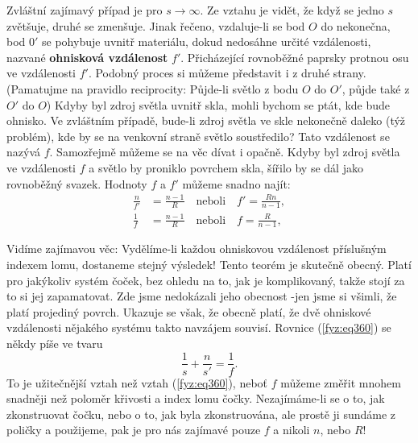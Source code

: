 {    Zvláštní zajímavý případ je pro \(s\rightarrow\infty\). Ze vztahu je vidět, že když se jedno 
    \(s\) zvětšuje, druhé se zmenšuje. Jinak řečeno, vzdaluje-li se bod \(O\) do nekonečna, bod 
    \(0'\) se pohybuje uvnitř materiálu, dokud nedosáhne určité vzdálenosti, nazvané 
    \textbf{ohnisková vzdálenost} \(f'\). Přicházející rovnoběžné paprsky protnou osu ve 
    vzdálenosti \(f'\). Podobný proces si můžeme představit i z druhé strany. (Pamatujme na 
    pravidlo reciprocity: Půjde-li světlo z bodu \(O\) do \(O'\), půjde také z \(O'\) do \(O\)) 
    Kdyby byl zdroj světla uvnitř skla, mohli bychom se ptát, kde bude ohnisko. Ve zvláštním 
    případě, bude-li zdroj světla ve skle nekonečně daleko (týž problém), kde by se na venkovní 
    straně světlo soustředilo? Tato vzdálenost se nazývá \(f\). Samozřejmě můžeme se na věc dívat i 
    opačně. Kdyby byl zdroj světla ve vzdálenosti \(f\) a světlo by proniklo povrchem skla, šířilo 
    by se dál jako rovnoběžný svazek. Hodnoty \(f\) a \(f'\) můžeme snadno najít:
    \begin{subequations}\label{fyz:eq361}
      \begin{align}
        \frac{n}{f'}&=\frac{n-1}{R} \quad\text{neboli}\quad f'=\frac{Rn}{n-1}, \label{fyz:eq361a} \\
        \frac{1}{f} &=\frac{n-1}{R} \quad\text{neboli}\quad f=\frac{R}{n-1}, \label{fyz:eq361b} 
      \end{align}
    \end{subequations}

    Vidíme zajímavou věc: Vydělíme-li každou ohniskovou vzdálenost příslušným indexem lomu, 
    dostaneme stejný výsledek! Tento teorém je skutečně obecný. Platí pro jakýkoliv systém čoček, 
    bez ohledu na to, jak je komplikovaný, takže stojí za to si jej zapamatovat. Zde jsme 
    nedokázali jeho obecnost -jen jsme si všimli, že platí projediný povrch. Ukazuje se však, že 
    obecně platí, že dvě ohniskové vzdálenosti nějakého systému takto navzájem souvisí. Rovnice 
    (\ref{fyz:eq360}) se někdy píše ve tvaru
    \begin{equation}\label{fyz:eq362}
        \frac{1}{s} + \frac{n}{s'} = \frac{1}{f}.
    \end{equation}
    To je užitečnější vztah než vztah (\ref{fyz:eq360}), neboť \(f\) můžeme změřit mnohem snadněji 
    než poloměr křivosti a index lomu čočky. Nezajímáme-li se o to, jak zkonstruovat čočku, nebo o 
    to, jak byla zkonstruována, ale prostě ji sundáme z poličky a použijeme, pak je pro nás 
    zajímavé pouze \(f\) a nikoli \(n\), nebo \(R\)!

}
